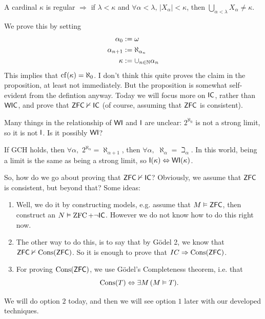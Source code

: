 \documentclass{article}
\begin{document}
\newlec

\begin{fancyprop}{}
    A cardinal $\kappa$ is regular $\Rightarrow$ if $\lambda < \kappa$ and $\forall \alpha < \lambda, \, |X_{\alpha}| < \kappa$, then $\bigcup_{\alpha < \lambda} X_{\alpha} \neq \kappa$.
\end{fancyprop}
\proof We prove this by setting \begin{align*}
    \alpha_{0} &:= \omega\\
    \alpha_{n+1} &:= \aleph_{\alpha_{n}}\\
    \kappa &:= \cup_{n \in \mathbb{N}} \alpha_{n}
\end{align*}
This implies that $\operatorname{cf}(\kappa) = \aleph_{0}$. I don't think this quite proves the claim in the proposition, at least not immediately. But the proposition is somewhat self-evident from the defintion anyway.\endproof
Today we will focus more on $\mathsf{IC}$, rather than $\mathsf{WIC}$, and prove that $\mathsf{ZFC} \nvdash \mathsf{IC}$ (of course, assuming that $\mathsf{ZFC}$ is consistent).
\begin{remark*}
    Many things in the relationship of $\mathsf{WI}$ and $\mathsf{I}$ are unclear: $2^{\aleph_{0}}$ is not a strong limit, so it is not $\mathsf{I}$. Is it possibly $\mathsf{WI}$?
\end{remark*}
\begin{remark*}
    If GCH holds, then $\forall \alpha, \,\, 2^{\aleph_{\alpha}}=\aleph_{\alpha+1}$, then $\forall \alpha, \,\, \aleph_{\alpha} = \beth_{\alpha}$. In this world, being a limit is the same as being a strong limit, so $\mathsf{I}(\kappa) \Leftrightarrow \mathsf{WI}(\kappa)$.
\end{remark*}
So, how do we go about proving that $\mathsf{ZFC} \nvdash \mathsf{IC}$? Obviously, we assume that $\mathsf{ZFC}$ is consistent, but beyond that? Some ideas: 
\begin{enumerate}
    \item Well, we do it by constructing models, e.g. assume that $M \vDash \mathsf{ZFC}$, then construct an $N \vDash \operatorname{ZFC} + \neg \mathsf{IC}$. However we do not know how to do this right now.
    \item The other way to do this, is to say that by G\"odel 2, we know that $\mathsf{ZFC} \nvdash \operatorname{Cons}(\mathsf{ZFC})$. So it is enough to prove that $IC \Rightarrow \operatorname{Cons}(\mathsf{ZFC})$.
    \item For proving $\operatorname{Cons}(\mathsf{ZFC})$, we use G\"odel's Completeness theorem, i.e. that \[ \operatorname{Cons}(T) \Leftrightarrow \exists M \, (M \vDash T).\]
\end{enumerate}
We will do option $2$ today, and then we will see option $1$ later with our developed techniques.
\end{document}
